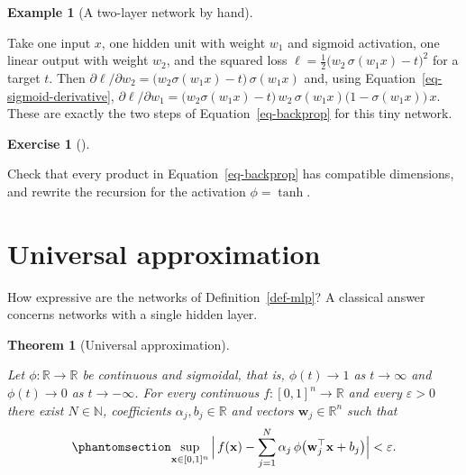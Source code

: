 \documentclass[
  english,
  11pt,
  a4paper,
  twoside,
  open=any,
  numbers=noenddot]{scrbook}
\theoremstyle{plain}
\newtheorem{theorem}{Theorem}[chapter]
\theoremstyle{plain}
\theoremstyle{plain}
\theoremstyle{definition}
\theoremstyle{definition}
\newtheorem{exercise}{Exercise}[chapter]
\theoremstyle{definition}
\newtheorem{example}{Example}[chapter]
\theoremstyle{remark}
\begin{document}
\begin{example}[A two-layer network by
hand]\protect\hypertarget{exm-two-layer}{}\label{exm-two-layer}

Take one input \(x\), one hidden unit with weight \(w_1\) and sigmoid
activation, one linear output with weight \(w_2\), and the squared loss
\(\ell = \tfrac12\big(w_2\,\sigma(w_1 x) - t\big)^2\) for a target
\(t\). Then
\(\partial\ell/\partial w_2 = \big(w_2\sigma(w_1 x) - t\big)\,\sigma(w_1 x)\)
and, using Equation~\ref{eq-sigmoid-derivative},
\(\partial\ell/\partial w_1 = \big(w_2\sigma(w_1x) - t\big)\,w_2\,\sigma(w_1x)\big(1-\sigma(w_1x)\big)\,x\).
These are exactly the two steps of Equation~\ref{eq-backprop} for this
tiny network.

\end{example}

\begin{exercise}[]\protect\hypertarget{exr-backprop-shapes}{}\label{exr-backprop-shapes}

Check that every product in Equation~\ref{eq-backprop} has compatible
dimensions, and rewrite the recursion for the activation
\(\phi = \tanh\).

\end{exercise}

\section{Universal
approximation}\label{sec-neural-networks-universal-approximation}

How expressive are the networks of Definition~\ref{def-mlp}? A classical
answer concerns networks with a single hidden layer.

\begin{theorem}[Universal
approximation]\protect\hypertarget{thm-universal-approximation}{}\label{thm-universal-approximation}

Let \(\phi\colon\mathbb{R}\to\mathbb{R}\) be continuous and sigmoidal,
that is, \(\phi(t)\to 1\) as \(t\to\infty\) and \(\phi(t)\to 0\) as
\(t\to-\infty\). For every continuous \(f\colon[0,1]^n\to\mathbb{R}\)
and every \(\varepsilon>0\) there exist \(N\in\mathbb{N}\), coefficients
\(\alpha_j, b_j\in\mathbb{R}\) and vectors
\(\mathbf{w}_j\in\mathbb{R}^n\) such that
\begin{equation}\protect\phantomsection\label{eq-universal}{
\sup_{\mathbf{x}\in[0,1]^n}\Big|\,f(\mathbf{x}) - \sum_{j=1}^{N}\alpha_j\,\phi\big(\mathbf{w}_j^\top\mathbf{x} + b_j\big)\Big| < \varepsilon .
}\end{equation}

\end{theorem}
\end{document}
